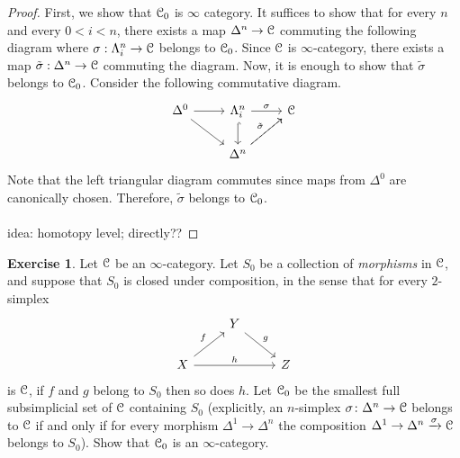 \documentclass[10pt,a4paper,reqno,oneside]{book} %
\theoremstyle{plain}
\theoremstyle{definition}
\newtheorem{exercise}[thm]{Exercise}
\theoremstyle{remark}
\numberwithin{equation}{section}
\begin{document}
\begin{proof}
    First, we show that $\mathcal C_0$ is $\infty$ category. It suffices to show that for every $n$ and every $0<i<n$, there exists a map $\Delta^n \to \mathcal C$ commuting the following diagram where $\sigma:\Lambda^n_i \to \mathcal C$ belongs to $\mathcal C_0$. Since $\mathcal C$ is $\infty$-category, there exists a map $\tilde{\sigma}:\Delta^n \to \mathcal C$ commuting the diagram. Now, it is enough to show that $\tilde{\sigma}$ belongs to $\mathcal C_0$. Consider the following commutative diagram.
    \[ \begin{tikzcd}
		\Delta^0 \arrow{r} \arrow{dr} & \Lambda^n_i \arrow{r}{\sigma} \arrow[hook]{d} & \cC \\
		{} & \Delta^n \arrow[dashed]{ur}{\tilde{\sigma}} \arrow{ur} & {} 
	\end{tikzcd} \]
	Note that the left triangular diagram commutes since maps from $\Delta^0$ are canonically chosen. Therefore, $\tilde{\sigma}$ belongs to $\mathcal C_0$. \\
	\\
	idea: homotopy level; directly??
	
\end{proof}

\begin{exercise}
	Let $\mathcal C$ be an $\infty$-category.
	Let $S_0$ be a collection of \emph{morphisms} in $\mathcal C$, and suppose that $S_0$ is closed under composition, in the sense that for every $2$-simplex
	\[ \begin{tikzcd}
	{} & Y \arrow{dr}{g} \\
	X \arrow{ur}{f} \arrow{rr}{h} & & Z
	\end{tikzcd} \]
	is $\mathcal C$, if $f$ and $g$ belong to $S_0$ then so does $h$.
	Let $\mathcal C_0$ be the smallest full subsimplicial set of $\mathcal C$ containing $S_0$ (explicitly, an $n$-simplex $\sigma \colon \Delta^n \to \mathcal C$ belongs to $\mathcal C$ if and only if for every morphism $\Delta^1 \to \Delta^n$ the composition $\Delta^1 \to \Delta^n \xrightarrow{\sigma} \mathcal C$ belongs to $S_0$).
	Show that $\mathcal C_0$ is an $\infty$-category.
\end{exercise}
\end{document}
